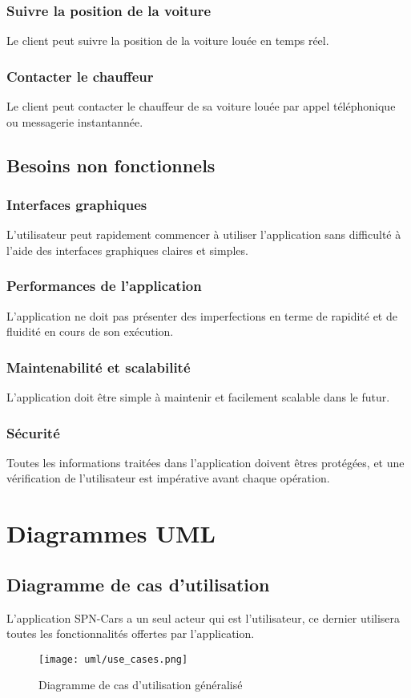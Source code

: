 \subsubsection{Suivre la position de la voiture}
Le client peut suivre la position de la voiture louée en temps réel.
\subsubsection{Contacter le chauffeur}
Le client peut contacter le chauffeur de sa voiture louée par appel téléphonique ou messagerie instantannée.
\subsection{Besoins non fonctionnels}
\subsubsection{Interfaces graphiques}
L'utilisateur peut rapidement commencer à utiliser l'application sans difficulté à l'aide des interfaces graphiques claires et simples.
\subsubsection{Performances de l'application}
L'application ne doit pas présenter des imperfections en terme de rapidité et de fluidité en cours de son exécution.
\subsubsection{Maintenabilité et scalabilité}
L'application doit être simple à maintenir et facilement scalable dans le futur.
\subsubsection{Sécurité}
Toutes les informations traitées dans l'application doivent êtres protégées, et une vérification de l'utilisateur est impérative avant chaque opération.
\section{Diagrammes UML}
\subsection{Diagramme de cas d'utilisation}
L'application SPN-Cars a un seul acteur qui est l'utilisateur, ce dernier utilisera toutes les fonctionnalités offertes par l'application.
\begin{figure}[H]
    \centering
    \texttt{[image: uml/use\_cases.png]}
    \vspace{1cm}
    \captionsetup{justification=centering}
    \caption{Diagramme de cas d'utilisation généralisé}
    \label{fig:use_case_diag}
\end{figure}
